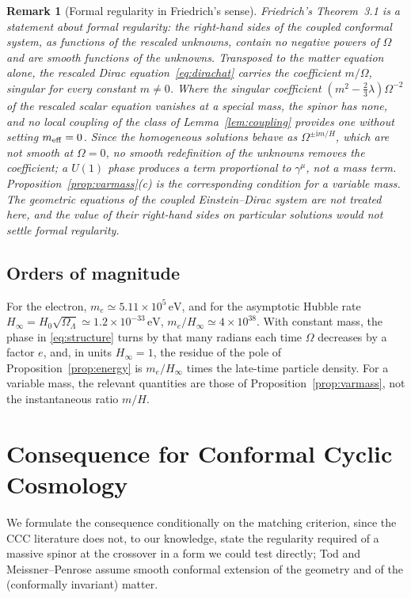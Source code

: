 \documentclass[11pt,a4paper]{article}
\newtheorem{remark}{Remark}
\theoremstyle{definition}
\newcommand{\ii}{\mathrm{i}}
\begin{document}
\begin{remark}[Formal regularity in Friedrich's sense]
\label{rem:friedrich}
Friedrich's Theorem~3.1 \cite{Friedrich2014} is a statement about formal regularity: the right-hand sides of the coupled conformal system, as functions of the rescaled unknowns, contain no negative powers of $\Omega$ and are smooth functions of the unknowns. Transposed to the matter equation alone, the rescaled Dirac equation~\eqref{eq:dirachat} carries the coefficient $m/\Omega$, singular for every constant $m\neq0$. Where the singular coefficient $(m^{2}-\tfrac23\lambda)\Omega^{-2}$ of the rescaled scalar equation vanishes at a special mass, the spinor has none, and no local coupling of the class of Lemma~\ref{lem:coupling} provides one without setting $m_{\rm eff}=0$. Since the homogeneous solutions behave as $\Omega^{\pm\ii m/H}$, which are not smooth at $\Omega=0$, no smooth redefinition of the unknowns removes the coefficient; a $U(1)$ phase produces a term proportional to $\gamma^{\mu}$, not a mass term. Proposition~\ref{prop:varmass}(c) is the corresponding condition for a variable mass. The geometric equations of the coupled Einstein--Dirac system are not treated here, and the value of their right-hand sides on particular solutions would not settle formal regularity.
\end{remark}

\subsection{Orders of magnitude}

For the electron, $m_{e}\simeq5.11\times10^{5}\,\mathrm{eV}$, and for the asymptotic Hubble rate $H_{\infty}=H_{0}\sqrt{\Omega_{\Lambda}}\simeq1.2\times10^{-33}\,\mathrm{eV}$, $m_{e}/H_{\infty}\simeq4\times10^{38}$. With constant mass, the phase in \eqref{eq:structure} turns by that many radians each time $\Omega$ decreases by a factor $e$, and, in units $H_{\infty}=1$, the residue of the pole of Proposition~\ref{prop:energy} is $m_{e}/H_{\infty}$ times the late-time particle density. For a variable mass, the relevant quantities are those of Proposition~\ref{prop:varmass}, not the instantaneous ratio $m/H$.

\section{Consequence for Conformal Cyclic Cosmology}
\label{sec:ccc}

We formulate the consequence conditionally on the matching criterion, since the CCC literature does not, to our knowledge, state the regularity required of a massive spinor at the crossover in a form we could test directly; Tod \cite{Tod2013} and Meissner--Penrose \cite{MeissnerPenrose2025} assume smooth conformal extension of the geometry and of the (conformally invariant) matter.
\end{document}
